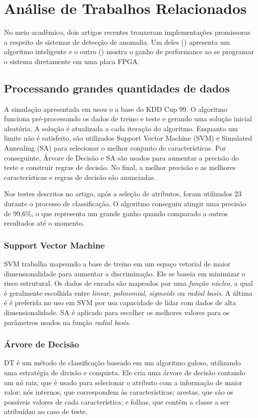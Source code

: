 \chapter{Análise de Trabalhos Relacionados}
\label{analise}

No meio acadêmico, dois artigos recentes trouxeram implementações promissoras a respeito de sistemas de detecção de
anomalia. Um deles (\cite{lin12}) apresenta um algoritmo inteligente e o outro (\cite{papadonikolakis12}) mostra o
ganho de performance ao se programar o sistema diretamente em uma placa FPGA.

\section{Processando grandes quantidades de dados}
A simulação apresentada em \cite{lin12} usou o a base do KDD Cup 99. O algoritmo funciona pré-processando os dados de treino e teste e gerando uma solução
inicial aleatória. A solução é atualizada a cada iteração do algoritmo. Enquanto um limite não é satisfeito,
são utilizados Support Vector Machine (SVM) e Simulated Annealing (SA) para selecionar o melhor conjunto de
características. Por conseguinte, Árvore de Decisão e SA são usados para aumentar a precisão do teste e construir
regras de decisão. No final, a melhor precisão e as melhores características e regras de decisão são anunciadas.
\par Nos testes descritos no  artigo, após a seleção de atributos, foram utilizados 23 durante o processo de
classificação. O algoritmo conseguiu atingir uma precisão de 99,6\%, o que representa um grande ganho quando comparado
 a outros resultados até o momento.

\subsection{Support Vector Machine}
SVM trabalha mapeando a base de treino em um espaço vetorial de maior dimensionalidade para aumentar a discriminação.
Ele se baseia em minimizar o risco estrutural. Os dados de enrada são mapeados por uma \textit{função núcleo}, a qual
é geralmente escolhida entre \textit{linear}, \textit{polinomial}, \textit{sigmoide} ou \textit{radial basis}. A última é
é preferida no uso em SVM por usa capacidade de lidar com dados de alta dimensionalidade. SA é aplicado para escolher
os melhores valores para os parâmetros usados na função \textit{radial basis}.

\subsection{Árvore de Decisão}
DT é um método de classificação baseado em um algoritmo guloso, utilizando uma estratégia de divisão e conquista. Ele
cria uma árvore de decisão contando um nó raiz, que é usado para selecionar o atributo com a informação de maior valor;
nós internos, que correspondem às características; arestas, que são os possíveis valores de cada característica; e
folhas, que contêm a classe a ser atribuídao ao caso de teste.


